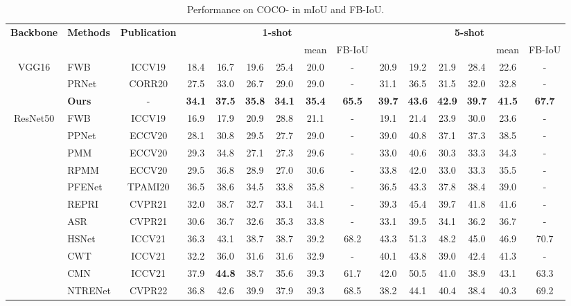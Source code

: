 \documentclass[journal]{IEEEtran}
\begin{document}
\begin{table*}[t]
\renewcommand\arraystretch{1.2}
\caption{Performance on COCO-\cite{lin2014microsoft} in mIoU and FB-IoU.  }
\label{table:result_coco}
\begin{center}
\begin{tabular}{c|lc|cccccc|cccccc}
\hline
\multirow{2}{*}{\textbf{Backbone}} & \multirow{2}{*}{\textbf{Methods}} &
\multirow{2}{*}{\textbf{Publication}} &
\multicolumn{6}{|c|}{\textbf{1-shot}} & \multicolumn{6}{c}{\textbf{5-shot}} \\ 
\multicolumn{1}{l|}{}      & \multicolumn{1}{l}{} & &     &     &     &     & mean & FB-IoU &     &    &     &     & mean & FB-IoU \\ 
\hline
\multirow{3}{*}{VGG16}      
& FWB\cite{nguyen2019feature} & ICCV19 & 18.4 & 16.7 & 19.6 & 25.4 & 20.0 & - & 20.9 & 19.2 & 21.9 & 28.4 & 22.6 & - \\
& PRNet\cite{liu2020prototype} & CORR20 & 27.5 & 33.0 & 26.7 & 29.0 & 29.0 & - & 31.1 & 36.5 & 31.5 & 32.0 & 32.8 & - \\
\cline{2-15}
& \textbf{Ours} & - & \textbf{34.1} & \textbf{37.5} & \textbf{35.8} & \textbf{34.1} & \textbf{35.4} & \textbf{65.5} &  \textbf{39.7} & \textbf{43.6} & \textbf{42.9} & \textbf{39.7} & \textbf{41.5} & \textbf{67.7} \\
\hline
                          
\multirow{12}{*}{ResNet50} 
& FWB\cite{nguyen2019feature} & ICCV19 & 16.9 & 17.9 & 20.9 & 28.8 & 21.1 & - & 19.1 & 21.4 & 23.9 & 30.0 & 23.6 & -\\
& PPNet\cite{liu2020part} &  ECCV20 & 28.1 & 30.8 & 29.5 & 27.7 & 29.0 & - & 39.0 & 40.8 & 37.1 & 37.3 & 38.5 & - \\
& PMM \cite{yang2020prototype} & ECCV20 & 29.3 & 34.8 & 27.1 & 27.3 & 29.6 & - & 33.0 & 40.6 & 30.3 & 33.3 & 34.3 & - \\
& RPMM \cite{yang2020prototype} & ECCV20 & 29.5 & 36.8 & 28.9 & 27.0 & 30.6 & - & 33.8 & 42.0 & 33.0 & 33.3 & 35.5 & - \\
& PFENet\cite{tian2020prior} & TPAMI20 & 36.5 & 38.6 & 34.5 & 33.8 & 35.8 & - & 36.5 & 43.3 & 37.8 & 38.4 & 39.0 & - \\
& REPRI\cite{boudiaf2021few} & CVPR21 & 32.0 & 38.7 & 32.7 & 33.1 & 34.1 & - & 39.3 & 45.4 & 39.7 & 41.8 & 41.6 & - \\

& ASR\cite{liu2021anti} & CVPR21 & 30.6 & 36.7 & 32.6 & 35.3 & 33.8 & - & 33.1 & 39.5 & 34.1 & 36.2 & 36.7 & - \\
& HSNet\cite{min2021hypercorrelation} & ICCV21 & 36.3 & 43.1 & 38.7 & 38.7 & 39.2 & 68.2 & 43.3 & 51.3 & 48.2 & 45.0 & 46.9 & 70.7 \\
&CWT \cite{lu2021simpler}&ICCV21&32.2&36.0&31.6&31.6&32.9&-&40.1&43.8&39.0&42.4&41.3&-\\
&CMN \cite{xie2021few}&ICCV21&37.9&\textbf{44.8}&38.7&35.6&39.3&61.7&42.0&50.5&41.0&38.9&43.1&63.3\\
&NTRENet \cite{liu2022learning} & CVPR22&36.8&42.6&39.9&37.9&39.3&68.5&38.2&44.1&40.4&38.4&40.3&69.2\\


\end{tabular}
\end{center}
\end{table*}
\end{document}
